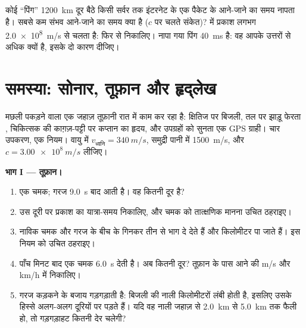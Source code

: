 \begin{exercise}[$\star\star\star$]\label{exo:g10:signals-and-waves:15}
कोई ``पिंग'' \qty{1200}{km} दूर बैठे किसी सर्वर तक इंटरनेट के एक पैकेट के
आने-जाने का समय नापता है। सबसे कम संभव आने-जाने का समय क्या है
($c$ पर चलते संकेत)?  में प्रकाश लगभग
\qty{2.0e8}{m/s} से चलता है: फिर से निकालिए। नापा गया पिंग \qty{40}{ms} है: वह आपके
उत्तरों से अधिक क्यों है, इसके दो कारण दीजिए।
\end{exercise}

\section{समस्या: सोनार, तूफ़ान और हृद्लेख}

\begin{problem}[{सप्ताहांत समस्या --- दुनिया के संकेत पढ़ना: एक ही नियम,
$d = v\,t$, जो तूफ़ान की दूरी नापता है, समुद्र-तल का नक्शा बनाता है, धड़कनें
गिनता है और GPS का भेद भी खोल देता है}]
\label{pb:g10:signals-and-waves:1}
मछली पकड़ने वाला एक जहाज़ तूफ़ानी रात में काम कर रहा है: क्षितिज पर
बिजली, तल पर झाड़ू फेरता , चिकित्सक की काग़ज़-पट्टी पर
कप्तान का हृदय, और उपग्रहों को सुनता एक GPS ग्राही। चार उपकरण,
एक नियम। वायु में $v_{\text{ध्वनि}} = \qty{340}{m/s}$, समुद्री पानी में \qty{1500}{m/s}, और $c = \qty{3.00e8}{m/s}$ लीजिए।

\medskip
\noindent\textbf{भाग I --- तूफ़ान।}
\begin{enumerate}
  \item एक चमक; गरज \qty{9.0}{s} बाद आती है। वह कितनी दूर है?
  \item उस दूरी पर प्रकाश का यात्रा-समय निकालिए, और चमक को तात्क्षणिक
        मानना उचित ठहराइए।
  \item नाविक चमक और गरज के बीच के  गिनकर तीन से भाग दे देते हैं और
        किलोमीटर पा जाते हैं। इस नियम को उचित ठहराइए।
  \item पाँच मिनट बाद एक चमक \qty{6.0}{s} देती है। अब कितनी दूर? तूफ़ान के
        पास आने की  \unit{m/s} और \unit{km/h} में निकालिए।
  \item गरज कड़कने के बजाय गड़गड़ाती है: बिजली की नाली किलोमीटरों लंबी
        होती है, इसलिए उसके हिस्से अलग-अलग दूरियों पर पड़ते हैं। यदि वह
        नाली जहाज़ से \qty{2.0}{km} से \qty{5.0}{km} तक फैली हो, तो गड़गड़ाहट कितनी
        देर चलेगी?
\end{enumerate}


\end{problem}
